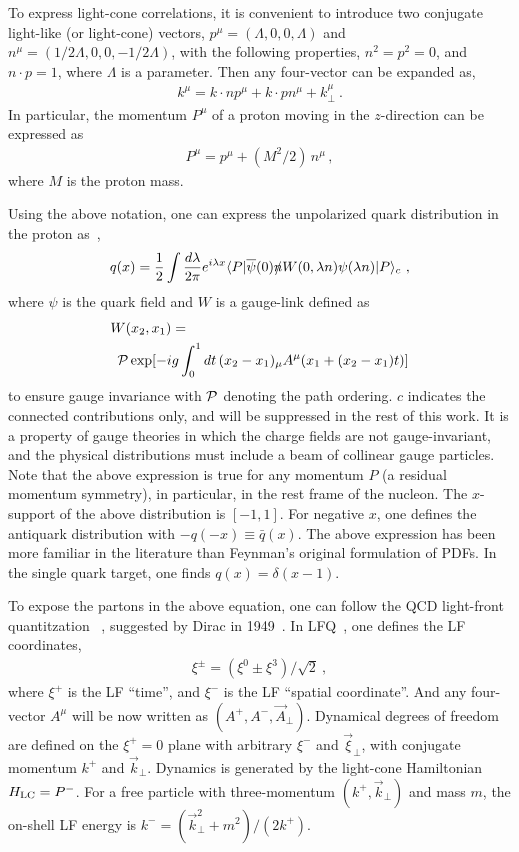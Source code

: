 \documentclass[aps,rmp,reprint,amsmath,amssymb,graphicx,longbibliography]{revtex4-1} %
\begin{document}
To express light-cone correlations, it is convenient to introduce
two conjugate light-like (or light-cone) vectors,
$p^\mu=(\Lambda,0,0,\Lambda)$ and $n^\mu=(1/2\Lambda,0,0,-1/2\Lambda)$, with the following properties,
$n^2=p^2=0$, and $n\cdot p=1$, where $\Lambda$ is a parameter. Then any four-vector can be expanded
as,
\begin{align}
	k^\mu = k\cdot n p^\mu + k\cdot p n^\mu  + k_\perp^\mu \ .
\end{align}
In particular, the momentum $P^\mu$ of a proton moving in the $z$-direction can be expressed as
\begin{align}
	P^\mu = p^\mu + (M^2/2)\, n^\mu \,,
\end{align}
where $M$ is the proton mass.

Using the above notation, one can express the unpolarized quark distribution
in the proton as~\cite{Collins:2011zzd},
\begin{align}
	q(x) =\frac{1}{2} \int \frac{d\lambda}{2\pi} e^{i\lambda x}
	\langle P|\overline{\psi}(0) \slashed{n} W(0,\lambda n)\psi(\lambda n)|P\rangle_c \ ,
	\label{eq:LCqPDF}
\end{align}
where $\psi$ is the quark field and $W$ is a gauge-link defined as
\begin{align}
	&W(x_2, x_1)= \nonumber\\
	&\hspace{0.5em}{\cal P}\exp[-ig\int_0^1 dt\,(x_2-x_1)_\mu A^\mu(x_1+(x_2-x_1)t)]
\end{align}
to ensure gauge invariance with ${\cal P}$ denoting the path ordering. $c$ indicates
the connected contributions only, and will be suppressed in the rest of this work.
It is a property of gauge theories in which the charge fields
are not gauge-invariant, and the physical distributions must include a beam of collinear gauge
particles. Note that the above expression is true
for any momentum $P$ (a residual momentum symmetry), in particular,
in the rest frame of the nucleon.
The $x$-support of the above distribution is $[-1,1]$. For negative $x$, one
defines the antiquark distribution with $-q(-x)\equiv \bar q(x)$.
The above expression has been more
familiar in the literature than Feynman's original formulation
of PDFs. In the single quark target, one finds
$q(x)=\delta(x-1)$.

To expose the partons in the above equation, one can follow the QCD light-front quantitzation
~\cite{Chang:1968bh,Kogut:1969xa,Drell:1970yt}, suggested by Dirac in 1949~\cite{Dirac:1949cp}.
In LFQ~\cite{Brodsky:1997de}, one defines the LF coordinates,
\begin{align}
	\xi^\pm = (\xi^0\pm \xi^3)/\sqrt{2} \ ,
\end{align}
where $\xi^+$ is the LF ``time'', and $\xi^-$ is the
LF ``spatial coordinate''. And any four-vector $A^\mu$ will be now written
as $(A^+,A^-,\vec{A}_\perp)$.
Dynamical degrees of freedom are defined on the $\xi^+=0$ plane with
arbitrary $\xi^-$ and $\vec{\xi}_\perp$, with conjugate momentum $k^+$
and $\vec{k}_\perp$. Dynamics is generated
by the light-cone Hamiltonian $H_{\rm LC}=P^-$. For a free particle with
three-momentum $(k^+, \vec{k}_\perp)$ and mass $m$, the {on-shell} LF
energy is $k^-=(\vec{k}_\perp^2+m^2)/(2k^+)$.
\end{document}
